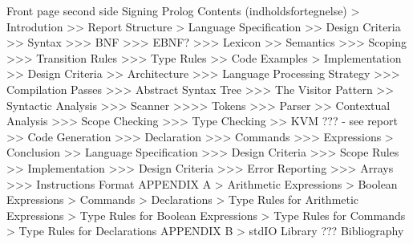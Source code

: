 Front page
second side
Signing
Prolog
Contents (indholdsfortegnelse)
> Introdution
>> Report Structure
> Language Specification
>> Design Criteria
>> Syntax
>>> BNF
>>> EBNF?
>>> Lexicon
>> Semantics
>>> Scoping
>>> Transition Rules
>>> Type Rules
>> Code Examples
> Implementation
>> Design Criteria
>> Architecture
>>> Language Processing Strategy
>>> Compilation Passes
>>> Abstract Syntax Tree
>>> The Visitor Pattern
>> Syntactic Analysis
>>> Scanner
>>>> Tokens
>>> Parser
>> Contextual Analysis
>>> Scope Checking
>>> Type Checking
>> KVM ??? - see report
>> Code Generation
>>> Declaration
>>> Commands
>>> Expressions
> Conclusion
>> Language Specification
>>> Design Criteria
>>> Scope Rules
>> Implementation
>>> Design Criteria
>>> Error Reporting
>>> Arrays
>>> Instructions Format
APPENDIX A
> Arithmetic Expressions
> Boolean Expressions
> Commands
> Declarations
> Type Rules for Arithmetic Expressions
> Type Rules for Boolean Expressions
> Type Rules for Commands
> Type Rules for Declarations
APPENDIX B
> stdIO Library ???
Bibliography